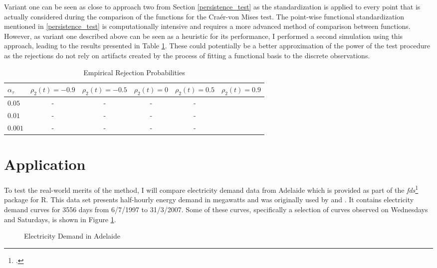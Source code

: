 \documentclass[12pt, a4paper]{article}
\theoremstyle{MAstyle} \newtheorem{assumption}{Assumption}[section]
\theoremstyle{MAstyle} \newtheorem{definition}{Definition}[section]
\theoremstyle{MAstyle} \newtheorem{theorem}{Theorem}[section]
\begin{document}
		Variant one can be seen as close to approach two from Section \ref{persistence_test} as the standardization is applied to every point that is actually considered during the comparison of the functions for the Cra\'{e}r-von Mises test. The point-wise functional standardization mentioned in \ref{persistence_test} is computationally intensive and requires a more advanced method of comparison between functions. 
		However, as variant one described above can be seen as a heuristic for its performance, I performed a second simulation using this approach, leading to the results presented in Table \ref{rej_probs_cor}. These could potentially be a better approximation of the power of the test procedure as the rejections do not rely on artifacts created by the process of fitting a functional basis to the discrete observations.
		\begin{table}[H]
			\centering
			\begin{tabular}{lccccc}\toprule
				$\alpha_{\tau}$ &$\rho_2(t) = -0.9$ &$\rho_2(t) = -0.5$ &$\rho_2(t) = 0$ &$\rho_2(t) = 0.5$ &$\rho_2(t) = 0.9$\\
				\midrule
				$0.05$	& - & -  &  - & -   &  \\
				$0.01$ 	& -	& -  &  - & -   &  \\
				$0.001$	& -	& -  &  - & -  &  \\
				\bottomrule
			\end{tabular}
			\caption{Empirical Rejection Probabilities}
			\label{rej_probs_cor}
		\end{table}

				
	\section{Application}\label{Application}
		To test the real-world merits of the method, I will compare electricity demand data from Adelaide which is provided as part of the \textit{fds}\footcite{fds} package for R. This data set presents half-hourly energy demand in megawatts and was originally used by \cite{magnano_generation_2007} and \cite{magnano_generation_2008}. It contains electricity demand curves for 3556 days from 6/7/1997 to 31/3/2007. Some of these curves, specifically a selection of curves observed on Wednesdays and Saturdays, is shown in Figure \ref{electricity_demand}.
		\begin{figure}[H]
			\caption{Electricity Demand in Adelaide}
			\label{electricity_demand}
		\end{figure}
	
\end{document}
